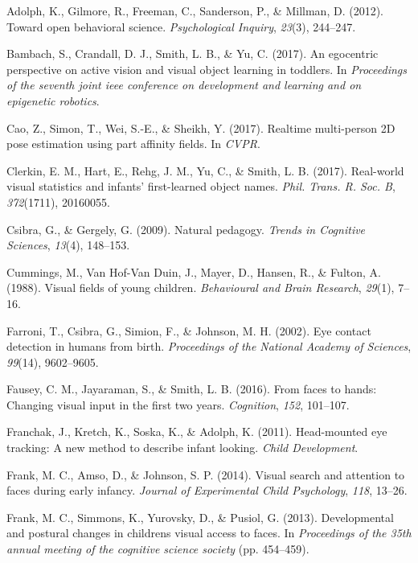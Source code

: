 \documentclass[10pt, letterpaper]{article}
\begin{document}
\hypertarget{ref-adolph2012}{}
Adolph, K., Gilmore, R., Freeman, C., Sanderson, P., \& Millman, D.
(2012). Toward open behavioral science. \emph{Psychological Inquiry},
\emph{23}(3), 244--247.

\hypertarget{ref-bambach2017}{}
Bambach, S., Crandall, D. J., Smith, L. B., \& Yu, C. (2017). An
egocentric perspective on active vision and visual object learning in
toddlers. In \emph{Proceedings of the seventh joint ieee conference on
development and learning and on epigenetic robotics}.

\hypertarget{ref-cao2017realtime}{}
Cao, Z., Simon, T., Wei, S.-E., \& Sheikh, Y. (2017). Realtime
multi-person 2D pose estimation using part affinity fields. In
\emph{CVPR}.

\hypertarget{ref-clerkin2017}{}
Clerkin, E. M., Hart, E., Rehg, J. M., Yu, C., \& Smith, L. B. (2017).
Real-world visual statistics and infants' first-learned object names.
\emph{Phil. Trans. R. Soc. B}, \emph{372}(1711), 20160055.

\hypertarget{ref-csibra2009natural}{}
Csibra, G., \& Gergely, G. (2009). Natural pedagogy. \emph{Trends in
Cognitive Sciences}, \emph{13}(4), 148--153.

\hypertarget{ref-cummings1988}{}
Cummings, M., Van Hof-Van Duin, J., Mayer, D., Hansen, R., \& Fulton, A.
(1988). Visual fields of young children. \emph{Behavioural and Brain
Research}, \emph{29}(1), 7--16.

\hypertarget{ref-farroni2002eye}{}
Farroni, T., Csibra, G., Simion, F., \& Johnson, M. H. (2002). Eye
contact detection in humans from birth. \emph{Proceedings of the
National Academy of Sciences}, \emph{99}(14), 9602--9605.

\hypertarget{ref-fausey2016}{}
Fausey, C. M., Jayaraman, S., \& Smith, L. B. (2016). From faces to
hands: Changing visual input in the first two years. \emph{Cognition},
\emph{152}, 101--107.

\hypertarget{ref-franchak2011}{}
Franchak, J., Kretch, K., Soska, K., \& Adolph, K. (2011). Head-mounted
eye tracking: A new method to describe infant looking. \emph{Child
Development}.

\hypertarget{ref-frank2014visual}{}
Frank, M. C., Amso, D., \& Johnson, S. P. (2014). Visual search and
attention to faces during early infancy. \emph{Journal of Experimental
Child Psychology}, \emph{118}, 13--26.

\hypertarget{ref-frank2013}{}
Frank, M. C., Simmons, K., Yurovsky, D., \& Pusiol, G. (2013).
Developmental and postural changes in childrens visual access to faces.
In \emph{Proceedings of the 35th annual meeting of the cognitive science
society} (pp. 454--459).
\end{document}
